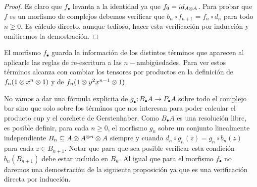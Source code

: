 \documentclass[fleqn,../tesis.tex]{subfiles}
\begin{document}
\begin{proof}
	Es claro que $f_{\bullet}$ levanta a la identidad ya que $f_0 = id_{A \otimes A}$. Para probar que
	$f$ es un morfismo de complejos debemos verificar que $b_n \circ f_{n + 1} = f_n \circ d_n$ para todo
	$n \geq 0$. Es cálculo directo, aunque tedioso, hacer esta verificación por inducción y omitiremos la demostración. 
\end{proof}
El morfismo $f_{\bullet}$ guarda la información de los distintos términos que aparecen al aplicarle las reglas
de re-escritura a las $n-$ambigüedades. Para ver estos términos alcanza con cambiar los tensores por productos
en la definición de $f_n(1 \otimes x^{n} \otimes 1)$ y de $f_n(1 \otimes y^2x^{n - 1} \otimes 1)$.

No vamos a dar una fórmula explicita de $g_{\bullet} : B_{\bullet}A \to P_{\bullet}A$ sobre todo el complejo bar
sino que solo sobre los términos que nos interesan para poder calcular el producto cup y el corchete de Gerstenhaber.
Como $B_{\bullet}A$ es una resolución libre, es posible definir, para cada $n \geq  0$, el morfismo $g_n$
sobre un conjunto linealmente independiente $B_n \subseteq A\otimes A^{\otimes n}\otimes A$ siempre y cuando
$d_n \circ g_n(z) = g_n \circ b_n(z)$ para cada $z \in B_{n + 1}$. Notar que para que sea posible verificar esta
condición $b_n(B_{n + 1})$ debe estar incluido en $ B_{n}$. Al igual que para el morfismo $f_{\bullet}$
no daremos una demostración de la siguiente proposición ya que es una verificación directa por inducción.
\end{document}
